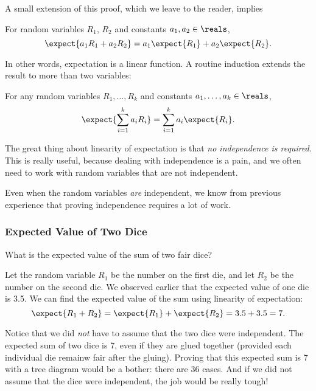 A small extension of this proof, which we leave to the reader, implies
\begin{theorem}
For random variables $R_1$, $R_2$ and constants $a_1,a_2 \in \reals$,
\[
\expect{a_1R_1 + a_2R_2} = a_1\expect{R_1} + a_2\expect{R_2}.
\]
\end{theorem}
In other words, expectation is a linear function.  A routine induction
extends the result to more than two variables:
\begin{corollary}\label{linexp-k-thm}
For any random variables $R_1, \dots, R_k$ and constants $a_1, \dots, a_k
\in \reals$,
\[
\expect{\sum_{i=1}^k a_iR_i} = \sum_{i=1}^k a_i\expect{R_i}.
\]
\end{corollary}

The great thing about linearity of expectation is that \emph{no
independence is required}.  This is really useful, because dealing with
independence is a pain, and we often need to work with random variables
that are not independent.

\begin{editingnotes}
Even when the random variables \emph{are} independent, we know
from previous experience that proving independence requires a lot of
work.
\end{editingnotes}


\subsubsection{Expected Value of Two Dice}

What is the expected value of the sum of two fair dice?

Let the random variable $R_1$ be the number on the first die, and let
$R_2$ be the number on the second die.  We observed earlier that the
expected value of one die is 3.5.  We can find the expected value of the
sum using linearity of expectation:
\begin{equation*}
\expect{R_1 + R_2}
 =   \expect{R_1} + \expect{R_2}
 =    3.5 + 3.5
 =    7.
\end{equation*}

Notice that we did \emph{not} have to assume that the two dice were
independent.  The expected sum of two dice is 7, even if they are glued
together (provided each individual die remainw fair after the gluing).
Proving that this expected sum is 7 with a tree diagram would be a bother:
there are 36 cases.  And if we did not assume that the dice were
independent, the job would be really tough!

